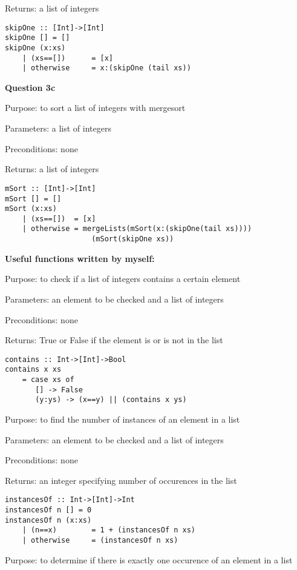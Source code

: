 \documentclass{article}
\begin{document}
Returns: a list of integers

\begin{lstlisting}
skipOne :: [Int]->[Int]
skipOne [] = []
skipOne (x:xs)
    | (xs==[])		= [x]
    | otherwise		= x:(skipOne (tail xs))
\end{lstlisting}

\textbf{Question 3c}

Purpose: to sort a list of integers with mergesort

Parameters: a list of integers

Preconditions: none

Returns: a list of integers

\begin{lstlisting}
mSort :: [Int]->[Int]
mSort [] = []
mSort (x:xs)
    | (xs==[])	= [x]
    | otherwise	= mergeLists(mSort(x:(skipOne(tail xs))))
				    (mSort(skipOne xs))
\end{lstlisting}
    
\newpage

\textbf{Useful functions written by myself:}

Purpose: to check if a list of integers contains a certain element

Parameters: an element to be checked and a list of integers

Preconditions: none

Returns: True or False if the element is or is not in the list

\begin{lstlisting}
contains :: Int->[Int]->Bool
contains x xs
    = case xs of
	   [] -> False
	   (y:ys) -> (x==y) || (contains x ys)
\end{lstlisting}

Purpose: to find the number of instances of an element in a list

Parameters: an element to be checked and a list of integers

Preconditions: none

Returns: an integer specifying number of occurences in the list

\begin{lstlisting}
instancesOf :: Int->[Int]->Int
instancesOf n [] = 0
instancesOf n (x:xs)
    | (n==x)		= 1 + (instancesOf n xs)
    | otherwise		= (instancesOf n xs)
\end{lstlisting}

Purpose: to determine if there is exactly one occurence of an element in a list
\end{document}
